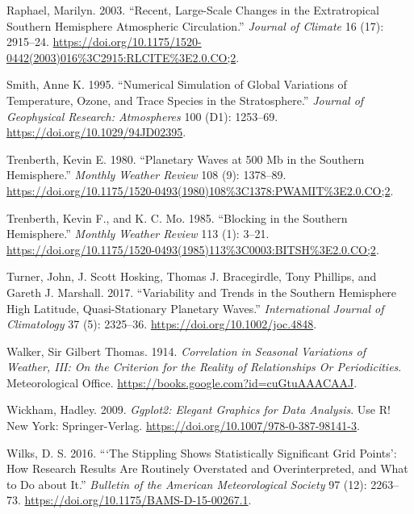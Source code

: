 \documentclass[smallextended]{svjour3}       %
\newlength{\cslhangindent}
\newlength{\cslentryspacingunit} %
\newenvironment{CSLReferences}[2] %
 {%
  \setlength{\parindent}{0pt}
  \ifodd #1
  \let\oldpar\par
  \def\par{\hangindent=\cslhangindent\oldpar}
  \fi
  \setlength{\parskip}{#2\cslentryspacingunit}
 }%
 {}
\begin{document}
\begin{CSLReferences}{1}{0}
\leavevmode{}%
Raphael, Marilyn. 2003. {``Recent, {Large-Scale Changes} in the {Extratropical Southern Hemisphere Atmospheric Circulation}.''} \emph{Journal of Climate} 16 (17): 2915--24. \url{https://doi.org/10.1175/1520-0442(2003)016\%3C2915:RLCITE\%3E2.0.CO;2}.

\leavevmode{}%
Smith, Anne K. 1995. {``Numerical Simulation of Global Variations of Temperature, Ozone, and Trace Species in the Stratosphere.''} \emph{Journal of Geophysical Research: Atmospheres} 100 (D1): 1253--69. \url{https://doi.org/10.1029/94JD02395}.

\leavevmode{}%
Trenberth, Kevin E. 1980. {``Planetary {Waves} at 500 Mb in the {Southern Hemisphere}.''} \emph{Monthly Weather Review} 108 (9): 1378--89. \url{https://doi.org/10.1175/1520-0493(1980)108\%3C1378:PWAMIT\%3E2.0.CO;2}.

\leavevmode{}%
Trenberth, Kevin F., and K. C. Mo. 1985. {``Blocking in the {Southern Hemisphere}.''} \emph{Monthly Weather Review} 113 (1): 3--21. \url{https://doi.org/10.1175/1520-0493(1985)113\%3C0003:BITSH\%3E2.0.CO;2}.

\leavevmode{}%
Turner, John, J. Scott Hosking, Thomas J. Bracegirdle, Tony Phillips, and Gareth J. Marshall. 2017. {``Variability and Trends in the {Southern Hemisphere} High Latitude, Quasi-Stationary Planetary Waves.''} \emph{International Journal of Climatology} 37 (5): 2325--36. \url{https://doi.org/10.1002/joc.4848}.

\leavevmode{}%
Walker, Sir Gilbert Thomas. 1914. \emph{Correlation in {Seasonal Variations} of {Weather}, {III}: {On} the {Criterion} for the {Reality} of {Relationships Or Periodicities}}. {Meteorological Office}. \url{https://books.google.com?id=cuGtuAAACAAJ}.

\leavevmode{}%
Wickham, Hadley. 2009. \emph{Ggplot2: {Elegant Graphics} for {Data Analysis}}. Use {R}! {New York}: {Springer-Verlag}. \url{https://doi.org/10.1007/978-0-387-98141-3}.

\leavevmode{}%
Wilks, D. S. 2016. {``{`{The Stippling Shows Statistically Significant Grid Points}'}: {How Research Results} Are {Routinely Overstated} and {Overinterpreted}, and {What} to {Do} about {It}.''} \emph{Bulletin of the American Meteorological Society} 97 (12): 2263--73. \url{https://doi.org/10.1175/BAMS-D-15-00267.1}.


\end{CSLReferences}
\end{document}
